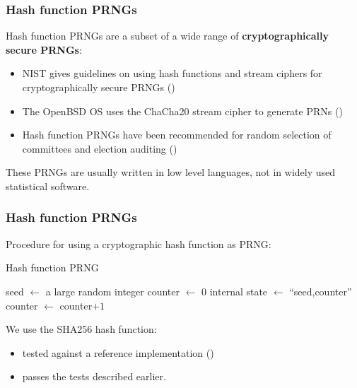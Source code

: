 \documentclass{beamer}
\newcommand*\Let[2]{\State #1 $\gets$ #2}
\newcommand{\bit}{\begin{itemize}}
\newcommand{\eit}{\end{itemize}}
\begin{document}
\begin{frame}
\frametitle{Hash function PRNGs}

Hash function PRNGs are a subset of a wide range of \textbf{cryptographically secure PRNGs}:
\vspace{10pt}
\bit
\item NIST gives guidelines on using hash functions and stream ciphers for cryptographically secure PRNGs (\cite{barker_nist_2015})
\item The OpenBSD OS uses the ChaCha20 stream cipher to generate PRNs (\cite{openbsd_arc4random_2014, chacha_bernstein_208})
\item Hash function PRNGs have been recommended for random selection of committees and election auditing (\cite{publicly_motorola_2004, rivest_reference_2011})
\eit
\vspace{10pt}

These PRNGs are usually written in low level languages, not in widely used statistical software.
\end{frame}



\begin{frame}\label{sha256_procedure}
\frametitle{Hash function PRNGs}

Procedure for using a cryptographic hash function as PRNG:


\begin{algorithm}[H]                      %
\caption{Hash function PRNG}          %
\label{hash_prng}                           %
\begin{algorithmic}[1]             %
\Let{seed}{a large random integer}
\Let{counter}{$0$}
     \Let{internal state}{``seed,counter''}
     \Let{counter}{counter$ + 1$}
\EndFor
\end{algorithmic}
\end{algorithm}


We use the SHA256 hash function:

\bit
\item tested against a reference implementation (\cite{rivest_reference_2011}) 
\item passes the tests described earlier. \hyperlink{sha256_tests}{}
\eit
\end{frame}
\end{document}
